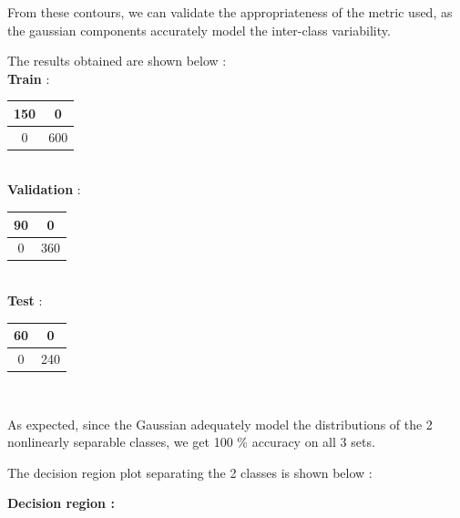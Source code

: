 \documentclass{article}
\begin{document}
\begin{flushleft}

From these contours, we can validate the appropriateness of the metric used, as the gaussian components accurately model the inter-class variability.

The results obtained are shown below : \\[10pt]

\textbf{Train} : \\[10pt]

\begin{tabular}{|c|c|}  \hline 150 & 0\\ \hline 0 & 600 \\ \hline \end{tabular} \\[10pt]

\textbf{Validation} : \\[10pt]

\begin{tabular}{|c|c|} \hline 90 & 0\\ \hline 0 & 360 \\ \hline \end{tabular} \\[10pt]


\textbf{Test} : \\[10pt]
\begin{tabular}{|c|c|}  \hline 60  & 0\\ \hline 0 & 240 \\ \hline \end{tabular} \\[10pt]

\begin{flushleft}
As expected, since the Gaussian adequately model the distributions of the 2 nonlinearly separable classes, we get 100 \% accuracy on all 3 sets.

The decision region plot separating the 2 classes is shown below :
\newpage
\end{flushleft}

\textbf{Decision region : } \\[5pt]

\end{flushleft}
\end{document}
